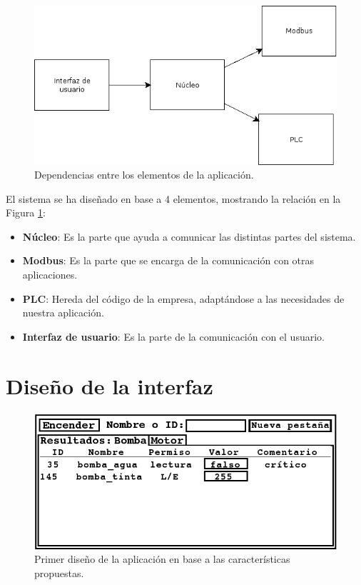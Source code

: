 \documentclass[pdftex,11pt,a4paper]{book}
\begin{document}
\begin{figure}
\includegraphics[width=\textwidth]{img/disenyo_arquitectura.png}
\caption{\label{disenyo_arquitectura}Dependencias entre los elementos de la aplicación.}
\end{figure}

El sistema se ha diseñado en base a 4 elementos, mostrando la relación en la Figura \ref{disenyo_arquitectura}:
\begin{itemize}
\item \textbf{Núcleo}: Es la parte que ayuda a comunicar las distintas partes del sistema.
\item \textbf{Modbus}: Es la parte que se encarga de la comunicación con otras aplicaciones.
\item \textbf{PLC}: Hereda del código de la empresa, adaptándose a las necesidades de nuestra aplicación.
\item \textbf{Interfaz de usuario}: Es la parte de la comunicación con el usuario.
\end{itemize}

\section{Diseño de la interfaz}
\begin{figure}
\includegraphics[width=\textwidth]{img/disenyo_ui0.png}
\caption{\label{disenyoUI0}Primer diseño de la aplicación en base a las características propuestas.}
\end{figure}
\end{document}
